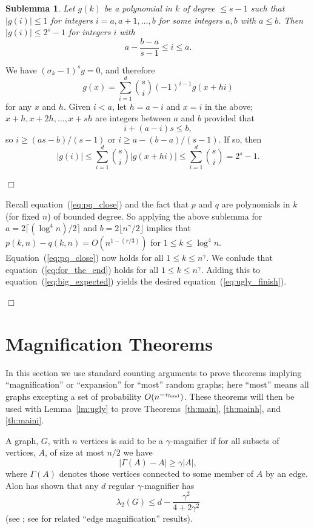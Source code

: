\documentclass[12pt]{article}
\newtheorem{sublemma}[theorem]{Sublemma}
\newcommand{\fund}{{\rm fund}}
\newcommand{\taufund}{{\tau_\fund}}
\newcommand{\proof}{{\par\noindent {\bf Proof}\space\space}}
\newcommand{\proofbox}{\begin{flushright}$\Box$\end{flushright}}
\begin{document}
\begin{sublemma} Let $g(k)$ be a polynomial in $k$ of degree $\le s-1$
such that $|g(i)|\le 1$ for integers $i=a,a+1,\ldots,b$ for some
integers $a,b$ with $a\le b$.  Then $|g(i)|\le 2^s-1$ for integers $i$
with
$$
a-\frac{b-a}{s-1} \le i \le a.
$$
\end{sublemma}
\proof We have $(\sigma_k-1)^s g =0$, and therefore
$$
g(x) = \sum_{i=1}^d \binom{s}{i}(-1)^{i-1} g(x+hi)
$$
for any $x$ and $h$.  Given $i<a$, let $h=a-i$ and $x=i$ in the above;
$x+h,x+2h,\ldots,x+sh$ are integers between $a$ and $b$ provided that
$$
i+(a-i)s \le b,
$$
so $i\ge (as-b)/(s-1)$ or $i\ge a-(b-a)/(s-1)$.  If so, then
$$
|g(i)| \le \sum_{i=1}^d \binom{s}{i} |g(x+hi)| \le 
\sum_{i=1}^d \binom{s}{i} = 2^s-1.
$$
\proofbox

Recall equation~(\ref{eq:pq_close}) and the fact that $p$ and $q$ are
polynomials in $k$ (for fixed $n$) of bounded degree.  So applying the
above sublemma for $a=2\lceil(\log^4 n)/2\rceil$ 
and $b=2\lfloor n^\gamma/2\rfloor$
implies
that $p(k,n)-q(k,n)=O(n^{1-(r/3)})$ for $1\le k\le\log^4n$.
Equation~(\ref{eq:pq_close}) now holds for all $1\le k\le n^\gamma$.
We conlude that equation~(\ref{eq:for_the_end}) holds 
for all $1\le k\le n^\gamma$.
Adding this to
equation~(\ref{eq:big_expected}) yields the desired
equation~(\ref{eq:ugly_finish}).
\proofbox
\section{Magnification Theorems}

In this section we use standard counting arguments to prove theorems
implying
``magnification'' or ``expansion'' for ``most'' random graphs;
here
``most'' means all graphs excepting a set of probability $O(n^{-\taufund})$.
These theorems will then be used with Lemma~\ref{lm:ugly} to
prove Theorems~\ref{th:main}, \ref{th:mainh}, and
\ref{th:maini}.

A graph, $G$, with $n$ vertices is said to be a $\gamma$-magnifier
if for all subsets of vertices, $A$, of size at most $n/2$ we have
$$
|\Gamma(A)-A| \ge \gamma|A|,
$$
where $\Gamma(A)$ denotes those vertices connected to some member of $A$
by an edge.  Alon has shown that any $d$ regular $\gamma$-magnifier has
$$
\lambda_2(G) \le d-\frac{\gamma^2}{4+2\gamma^2}
$$
(see \cite{alon_eigenvalues}; see \cite{dodziuk,jerrum1,jerrum2} for related
``edge magnification'' results).
\end{document}
